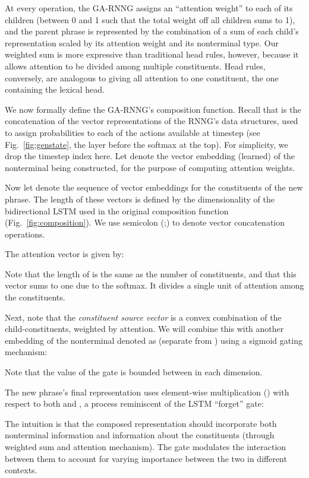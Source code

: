 \documentclass[11pt]{article}
\newcommand{\ignore}[1]{}
\newcommand{\ask}[1]{\textcolor{orange}{{\textbf{[#1 --\textsc{ask}]}}}}
\newcommand{\nascomment}[1]{\textcolor{blue}{{\textbf{[#1 --\textsc{nas}]}}}}
\renewcommand{\ask}[1]{}
\renewcommand{\nascomment}[1]{}
\begin{document}
At every  operation, the GA-RNNG assigns an ``attention weight'' to each of its children (between 0 and 1 such that the total weight off all children sums to 1), and the parent phrase is represented by the combination of a sum of each child's representation scaled by its attention weight and its nonterminal type. Our weighted sum is more expressive than traditional head rules, however, because it allows attention to be divided among multiple constituents. Head rules, conversely, are analogous to giving all attention to one constituent, the one containing the lexical head.

We now formally define the GA-RNNG's composition function.
Recall that  is the concatenation of the vector representations of the RNNG's data structures, used to assign probabilities to each of the actions available at timestep  (see Fig.~\ref{fig:genstate}, the layer before the softmax at the top). For simplicity, we drop the timestep index here. Let  denote the vector embedding (learned) of the nonterminal being constructed, for the purpose of computing attention weights. 

Now let  denote the sequence of vector embeddings for the constituents of the new phrase.  The length of these vectors is defined by the dimensionality of the bidirectional LSTM used in the original composition function (Fig.~\ref{fig:composition}). We use semicolon (;) to denote vector concatenation operations.

The attention vector is given by:

Note that the length of  is the same as the number of constituents, and that this vector sums to one due to the softmax.  It divides a single unit of attention among the constituents.







Next, note that the \emph{constituent source vector}  is a convex combination of the child-constituents, weighted by attention.  We will combine this with another embedding of the nonterminal denoted as  (separate from ) using a sigmoid gating mechanism:

Note that the value of the gate is bounded between  in each dimension.

The new phrase's final representation uses element-wise multiplication () with respect to both  and , a process reminiscent of the LSTM ``forget'' gate:


The intuition is that the composed representation should incorporate both nonterminal information and information about the constituents (through weighted sum and attention mechanism). The gate  modulates the interaction between them to account for varying importance between the two in different contexts.  \ignore{\ask{add figure here. Or not, if the equations and intuitions are clear enough; I tried making it as clear as possible since some reviewers may not be familiar with attention (mostly used in MT). Any thoughts?}. \nascomment{I don't think we need a figure.  I tried to make it even cleaner; please check carefully.  I got rid of some symbols.}}
\end{document}
